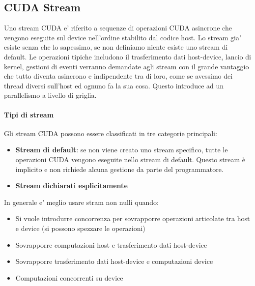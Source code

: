 \subsection{CUDA Stream}
Uno stream CUDA e' riferito a sequenze di operazioni CUDA asincrone che vengono eseguite sul device nell'ordine stabilito dal codice host. Lo stream gia' esiste senza che lo sapessimo, se non definiamo niente esiste uno stream di default.
Le operazioni tipiche includono il trasferimento dati host-device, lancio di kernel, gestioni di eventi verranno demandate agli stream con il grande vantaggio che tutto diventa asincrono e indipendente tra di loro, come se avessimo dei thread diversi sull'host ed ognuno fa la sua cosa.
Questo introduce ad un parallelismo a livello di griglia.

\paragraph{Tipi di stream}
    Gli stream CUDA possono essere classificati in tre categorie principali:
    \begin{itemize}
        \item \textbf{Stream di default}: se non viene creato uno stream specifico, tutte le operazioni CUDA vengono eseguite nello stream di default. Questo stream è implicito e non richiede alcuna gestione da parte del programmatore.
        \item \textbf{Stream dichiarati esplicitamente}
    \end{itemize}
    
    In generale e' meglio usare stram non nulli quando:
   \begin{itemize}
    \item Si vuole introdurre concorrenza per sovrapporre operazioni articolate tra host e device (si possono spezzare le operazioni)
    \item Sovrapporre computazioni host e trasferimento dati host-device
    \item Sovrapporre trasferimento dati host-device e computazioni device
    \item Computazioni concorrenti su device
   \end{itemize} 

